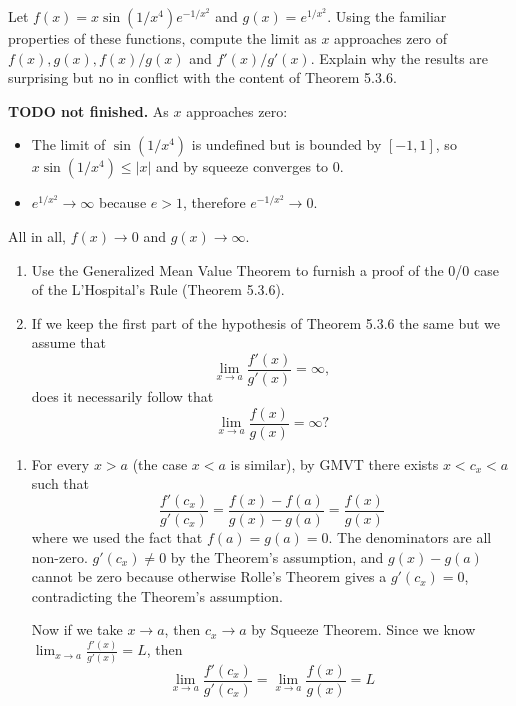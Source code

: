 \documentclass{oxmathproblems}
\begin{document}
\begin{questions}
\miquestion Let $f(x)=x \sin(1/x^4)e^{-1/x^2}$ and $g(x)=e^{1/x^2}$. Using the familiar properties of these functions, compute the limit as $x$ approaches zero of
$f(x), g(x), f(x)/g(x)$ and $f'(x)/g'(x)$. Explain why the results are surprising but no in conflict with the content of Theorem 5.3.6.
\begin{solution}
  \textbf{TODO not finished.} As $x$ approaches zero:
  \begin{itemize}
    \item The limit of $\sin(1/x^4)$ is undefined but is bounded by $[-1, 1]$, so $x \sin(1/x^4) \leq |x|$ and by squeeze converges to 0.
    \item $e^{1/x^2} \to \infty$ because $e > 1$, therefore $e^{-1/x^2}\to0$.
  \end{itemize}

  All in all, $f(x) \to 0$ and $g(x) \to \infty$.
\end{solution}

\miquestion
\begin{enumerate}[label=(\alph*)]
  \item Use the Generalized Mean Value Theorem to furnish a proof of the 0/0 case of the L'Hospital's Rule (Theorem 5.3.6).
  \item If we keep the first part of the hypothesis of Theorem 5.3.6 the same but we assume that
  \[\lim_{x \to a}\frac{f'(x)}{g'(x)}=\infty,\]
  does it necessarily follow that
  \[\lim_{x \to a}\frac{f(x)}{g(x)}=\infty?\]
\end{enumerate}

\begin{solution}
  \begin{enumerate}[label=(\alph*)]
    \item For every $x > a$ (the case $x < a$ is similar), by GMVT there exists $x < c_{x} < a$ such that
    \[\frac{f'(c_{x})}{g'(c_{x})}=\frac{f(x)-f(a)}{g(x)-g(a)}=\frac{f(x)}{g(x)}\]
    where we used the fact that $f(a)=g(a)=0$. The denominators are all non-zero. $g'(c_{x}) \neq 0$
    by the Theorem's assumption, and $g(x)-g(a)$ cannot be zero because otherwise Rolle's Theorem gives a $g'(c_{x})=0$, contradicting
    the Theorem's assumption. 

    Now if we take $x \to a$, then $c_{x} \to a$ by Squeeze Theorem. Since we know $\lim_{x \to a}\frac{f'(x)}{g'(x)}=L$, then
    \[\lim_{x \to a}\frac{f'(c_{x})}{g'(c_{x})}=\lim_{x \to a}\frac{f(x)}{g(x)}=L\]


\end{enumerate}
\end{solution}
\end{questions}
\end{document}
